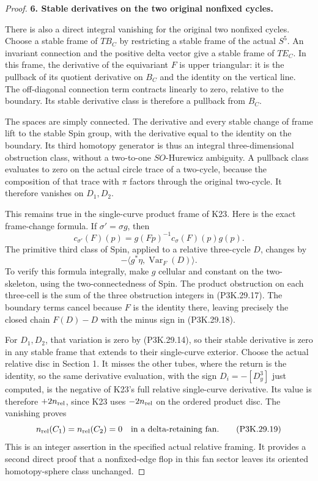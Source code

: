 \begin{proof}
\par\medskip\noindent\textbf{6. Stable derivatives on the two original nonfixed cycles.}\enspace

There is also a direct integral vanishing for the original
two nonfixed cycles. Choose a stable frame of \(TB_C\)
by restricting a stable frame of the actual \(S^5\).
An invariant connection and the positive delta vector
give a stable frame of \(TE_C\). In this frame, the
derivative of the equivariant \(F\) is upper triangular:
it is the pullback of its quotient derivative on \(B_C\)
and the identity on the vertical line. The off-diagonal
connection term contracts linearly to zero, relative
to the boundary. Its stable derivative class is therefore
a pullback from \(B_C\).

The spaces are simply connected. The derivative and every
stable change of frame lift to the stable Spin group,
with the derivative equal to the identity on the boundary.
Its third homotopy generator is thus an integral
three-dimensional obstruction class, without a
two-to-one \(SO\)-Hurewicz ambiguity. A pullback class
evaluates to zero on the actual circle trace of a
two-cycle, because the composition of that trace with
\(\pi\) factors through the original two-cycle.
It therefore vanishes on \(D_1,D_2\).

This remains true in the single-curve product frame of
K23. Here is the exact frame-change formula. If
\(\sigma'=\sigma g\), then
\[
       c_{\sigma'}(F)(p)=
       g(Fp)^{-1}c_\sigma(F)(p)g(p).
                                                        \tag{P3K.29.17}
\]
The primitive third class of Spin, applied to a relative
three-cycle \(D\), changes by
\[
              -\langle g^*\eta,\operatorname{Var}_F(D)\rangle.
                                                        \tag{P3K.29.18}
\]
To verify this formula integrally, make \(g\) cellular and
constant on the two-skeleton, using the two-connectedness
of Spin. The product obstruction on each three-cell is
the sum of the three obstruction integers in
(P3K.29.17). The boundary terms cancel because \(F\) is
the identity there, leaving precisely the closed chain
\(F(D)-D\) with the minus sign in (P3K.29.18).

For \(D_1,D_2\), that variation is zero by
(P3K.29.14), so their stable derivative is zero in any
stable frame that extends to their single-curve exterior.
Choose the actual relative disc in Section 1. It misses
the other tubes, where the return is the identity, so the
same derivative evaluation, with the sign \(D_i=-[D^3_y]\)
just computed, is the negative of K23's full relative
single-curve derivative. Its value is therefore
\(+2n_{\rm rel}\), since K23 uses \(-2n_{\rm rel}\) on
the ordered product disc. The vanishing proves
\[
         n_{\rm rel}(C_1)=n_{\rm rel}(C_2)=0
             \quad\hbox{in a delta-retaining fan}.
                                                        \tag{P3K.29.19}
\]
This is an integer assertion in the specified actual
relative framing. It provides a second direct proof that
a nonfixed-edge flop in this fan sector leaves its
oriented homotopy-sphere class unchanged.


\end{proof}
